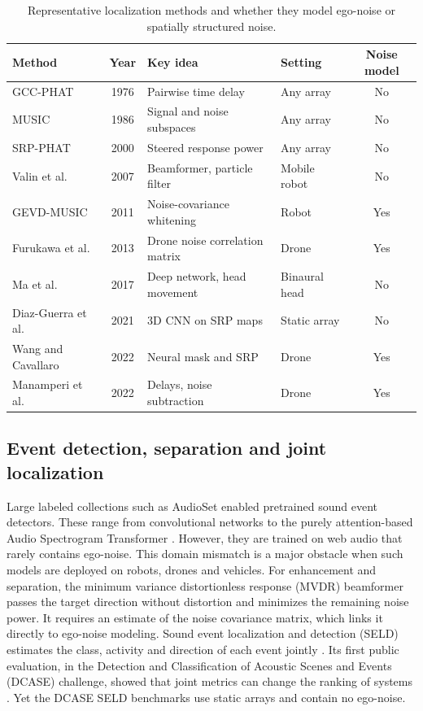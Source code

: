 \documentclass{svproc}
\begin{document}
\begin{table}[t]
\centering
\scriptsize
\setlength{\tabcolsep}{4pt}
\caption{Representative localization methods and whether they model ego-noise or spatially structured noise.}
\label{tab:ssl}
\begin{tabular}{|l|c|l|l|c|}
\hline
\textbf{Method} & \textbf{Year} & \textbf{Key idea} & \textbf{Setting} & \textbf{Noise model} \\
\hline
GCC-PHAT \cite{knapp1976gcc} & 1976 & Pairwise time delay & Any array & No \\
MUSIC \cite{schmidt1986music} & 1986 & Signal and noise subspaces & Any array & No \\
SRP-PHAT \cite{dibiase2000srp} & 2000 & Steered response power & Any array & No \\
Valin et al. \cite{valin2007tracking} & 2007 & Beamformer, particle filter & Mobile robot & No \\
GEVD-MUSIC \cite{nakamura2011gevd} & 2011 & Noise-covariance whitening & Robot & Yes \\
Furukawa et al. \cite{furukawa2013ncm} & 2013 & Drone noise correlation matrix & Drone & Yes \\
Ma et al. \cite{ma2017binaural} & 2017 & Deep network, head movement & Binaural head  & No \\
Diaz-Guerra et al. \cite{diazguerra2021cross3d} & 2021 & 3D CNN on SRP maps & Static array & No \\
Wang and Cavallaro \cite{wang2022drone} & 2022 & Neural mask and SRP & Drone & Yes \\
Manamperi et al. \cite{manamperi2022drone} & 2022 & Delays, noise subtraction & Drone & Yes \\
\hline
\end{tabular}
\end{table}


\subsection{Event detection, separation and joint localization}
Large labeled collections such as AudioSet \cite{gemmeke2017audioset} enabled pretrained sound event detectors.
These range from convolutional networks \cite{kong2020panns} to the purely attention-based Audio Spectrogram Transformer \cite{gong2021ast}.
However, they are trained on web audio that rarely contains ego-noise.
This domain mismatch is a major obstacle when such models are deployed on robots, drones and vehicles.
For enhancement and separation, the minimum variance distortionless response (MVDR) beamformer \cite{capon1969mvdr} passes the target direction without distortion and minimizes the remaining noise power.
It requires an estimate of the noise covariance matrix, which links it directly to ego-noise modeling.
Sound event localization and detection (SELD) estimates the class, activity and direction of each event jointly \cite{adavanne2019seld}.
Its first public evaluation, in the Detection and Classification of Acoustic Scenes and Events (DCASE) challenge, showed that joint metrics can change the ranking of systems \cite{politis2021dcase}. Yet the DCASE SELD benchmarks use static arrays and contain no ego-noise.
\end{document}
